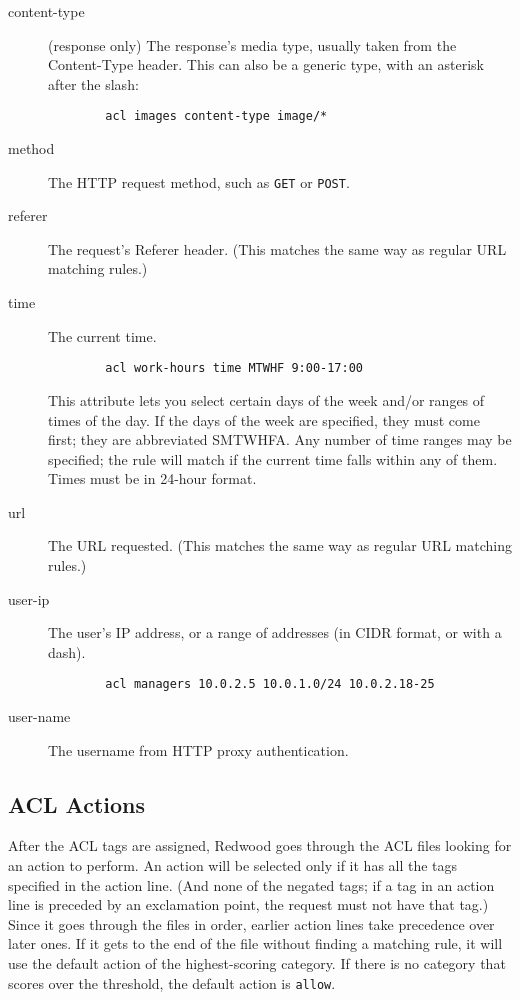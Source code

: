 \documentclass{article}
\begin{document}
\begin{description}

	\item[content-type] (response only) The response's media type, usually taken from the Content-Type header.
		This can also be a generic type, with an asterisk after the slash:

		\begin{verbatim}
		acl images content-type image/*
		\end{verbatim}

	\item[method] The HTTP request method, such as \verb"GET" or \verb"POST".

	\item[referer] The request's Referer header. (This matches the same way as regular URL matching rules.)

	\item[time] The current time.

		\begin{verbatim}
		acl work-hours time MTWHF 9:00-17:00
		\end{verbatim}

		This attribute lets you select certain days of the week and/or ranges of times of the day.
		If the days of the week are specified, they must come first; they are abbreviated SMTWHFA.
		Any number of time ranges may be specified; the rule will match if the current time falls within any of them.
		Times must be in 24-hour format.

	\item[url] The URL requested. (This matches the same way as regular URL matching rules.)

	\item[user-ip] The user's IP address, or a range of addresses (in CIDR format, or with a dash).

		\begin{verbatim}
		acl managers 10.0.2.5 10.0.1.0/24 10.0.2.18-25
		\end{verbatim}

	\item[user-name] The username from HTTP proxy authentication.
	
\end{description}

\subsection{ACL Actions}

After the ACL tags are assigned, Redwood goes through the ACL files looking for an action to perform.
An action will be selected only if it has all the tags specified in the action line.
(And none of the negated tags; if a tag in an action line is preceded by an exclamation point, 
the request must not have that tag.)
Since it goes through the files in order, earlier action lines take precedence over later ones.
If it gets to the end of the file without finding a matching rule,
it will use the default action of the highest-scoring category.
If there is no category that scores over the threshold, the default action is \verb"allow".
\end{document}
